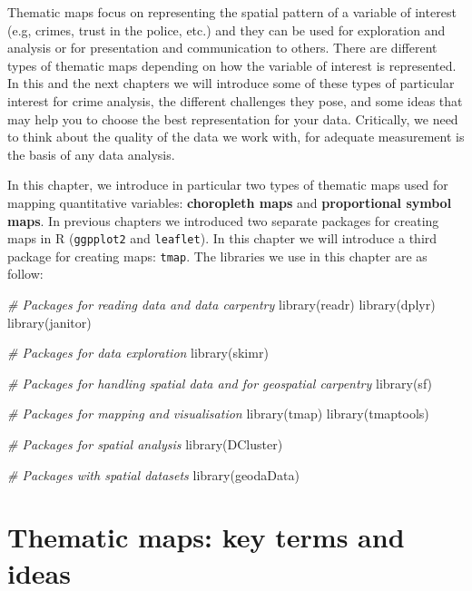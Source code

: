 \documentclass[
  krantz2]{krantz}
\makeatletter
\newenvironment{Shaded}{\begin{snugshade}}{\end{snugshade}}
\newcommand{\CommentTok}[1]{\textcolor[rgb]{0.37,0.37,0.37}{\textit{#1}}}
\newcommand{\FunctionTok}[1]{\textcolor[rgb]{0,0,0}{#1}}
\newcommand{\NormalTok}[1]{#1}
\newenvironment{kframe}{%
\medskip{}
\setlength{\fboxsep}{.8em}
 \def\at@end@of@kframe{}%
 \ifinner\ifhmode%
  \def\at@end@of@kframe{\end{minipage}}%
  \begin{minipage}{\columnwidth}%
 \fi\fi%
 \def\FrameCommand##1{\hskip\@totalleftmargin \hskip-\fboxsep
 \colorbox{shadecolor}{##1}\hskip-\fboxsep
     \hskip-\linewidth \hskip-\@totalleftmargin \hskip\columnwidth}%
 \MakeFramed {\advance\hsize-\width
   \@totalleftmargin\z@ \linewidth\hsize
   \@setminipage}}%
 {\par\unskip\endMakeFramed%
 \at@end@of@kframe}
\renewenvironment{Shaded}{\begin{kframe}}{\end{kframe}}
\makeatother
\begin{document}
Thematic maps focus on representing the spatial pattern of a variable of interest (e.g, crimes, trust in the police, etc.) and they can be used for exploration and analysis or for presentation and communication to others. There are different types of thematic maps depending on how the variable of interest is represented. In this and the next chapters we will introduce some of these types of particular interest for crime analysis, the different challenges they pose, and some ideas that may help you to choose the best representation for your data. Critically, we need to think about the quality of the data we work with, for adequate measurement is the basis of any data analysis.

In this chapter, we introduce in particular two types of thematic maps used for mapping quantitative variables: \textbf{choropleth maps} and \textbf{proportional symbol maps}. In previous chapters we introduced two separate packages for creating maps in R (\texttt{ggpplot2} and \texttt{leaflet}). In this chapter we will introduce a third package for creating maps: \texttt{tmap}. The libraries we use in this chapter are as follow:

\begin{Shaded}
\begin{Highlighting}[]
\CommentTok{\# Packages for reading data and data carpentry}
\FunctionTok{library}\NormalTok{(readr)}
\FunctionTok{library}\NormalTok{(dplyr)}
\FunctionTok{library}\NormalTok{(janitor)}

\CommentTok{\# Packages for data exploration}
\FunctionTok{library}\NormalTok{(skimr)}

\CommentTok{\# Packages for handling spatial data and for geospatial carpentry}
\FunctionTok{library}\NormalTok{(sf)}

\CommentTok{\# Packages for mapping and visualisation}
\FunctionTok{library}\NormalTok{(tmap)}
\FunctionTok{library}\NormalTok{(tmaptools)}

\CommentTok{\# Packages for spatial analysis}
\FunctionTok{library}\NormalTok{(DCluster)}

\CommentTok{\# Packages with spatial datasets}
\FunctionTok{library}\NormalTok{(geodaData)}
\end{Highlighting}
\end{Shaded}

\hypertarget{thematic-maps-key-terms-and-ideas}{%
\section{Thematic maps: key terms and ideas}\label{thematic-maps-key-terms-and-ideas}}
\end{document}
